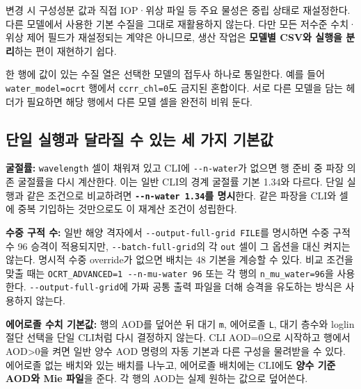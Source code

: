 변경 시 구성성분 값과 직접 IOP·위상 파일 등 주요 물성은 중립 상태로 재설정한다. 다른 모델에서 사용한 기본 수질을 그대로 재활용하지 않는다. 다만 모든 저수준 수치·위상 제어 필드가 재설정되는 계약은 아니므로, 생산 작업은 \textbf{모델별 CSV와 실행을 분리}하는 편이 재현하기 쉽다.

한 행에 값이 있는 수질 열은 선택한 모델의 접두사 하나로 통일한다. 예를 들어 \texttt{water\_\allowbreak{}model=\allowbreak{}ocrt} 행에서 \texttt{ccrr\_\allowbreak{}chl=\allowbreak{}0}도 금지된 혼합이다. 서로 다른 모델을 담는 헤더가 필요하면 해당 행에서 다른 모델 셀을 완전히 비워 둔다.

\subsection{단일 실행과 달라질 수 있는 세 가지 기본값}
\label{sec:auto:08_input_formats:2.4}
\textbf{굴절률:} \texttt{wavelength} 셀이 채워져 있고 CLI에 \texttt{-\allowbreak{}-\allowbreak{}n-\allowbreak{}water}가 없으면 행 준비 중 파장 의존 굴절률을 다시 계산한다. 이는 일반 CLI의 경계 굴절률 기본 1.34와 다르다. 단일 실행과 같은 조건으로 비교하려면 \textbf{\texttt{-\allowbreak{}-\allowbreak{}n-\allowbreak{}water 1.\allowbreak{}34}를 명시}한다. 같은 파장을 CLI와 셀에 중복 기입하는 것만으로도 이 재계산 조건이 성립한다.

\textbf{수중 구적 수:} 일반 해양 격자에서 \texttt{-\allowbreak{}-\allowbreak{}output-\allowbreak{}full-\allowbreak{}grid FILE}를 명시하면 수중 구적 수 96 승격이 적용되지만, \texttt{-\allowbreak{}-\allowbreak{}batch-\allowbreak{}full-\allowbreak{}grid}의 각 \texttt{out} 셀이 그 옵션을 대신 켜지는 않는다. 명시적 수중 override가 없으면 배치는 48 기본을 계승할 수 있다. 비교 조건을 맞출 때는 \texttt{OCRT\_\allowbreak{}ADVANCED=\allowbreak{}1 -\allowbreak{}-\allowbreak{}n-\allowbreak{}mu-\allowbreak{}water 96} 또는 각 행의 \texttt{n\_\allowbreak{}mu\_\allowbreak{}water=\allowbreak{}96}을 사용한다. \texttt{-\allowbreak{}-\allowbreak{}output-\allowbreak{}full-\allowbreak{}grid}에 가짜 공통 출력 파일을 더해 승격을 유도하는 방식은 사용하지 않는다.

\textbf{에어로졸 수치 기본값:} 행의 AOD를 덮어쓴 뒤 대기 \texttt{m}, 에어로졸 \texttt{L}, 대기 층수와 loglin 절단 선택을 단일 CLI처럼 다시 결정하지 않는다. CLI AOD=0으로 시작하고 행에서 AOD>0을 켜면 일반 양수 AOD 명령의 자동 기본과 다른 구성을 물려받을 수 있다. 에어로졸 없는 배치와 있는 배치를 나누고, 에어로졸 배치에는 CLI에도 \textbf{양수 기준 AOD와 Mie 파일}을 준다. 각 행의 AOD는 실제 원하는 값으로 덮어쓴다.

